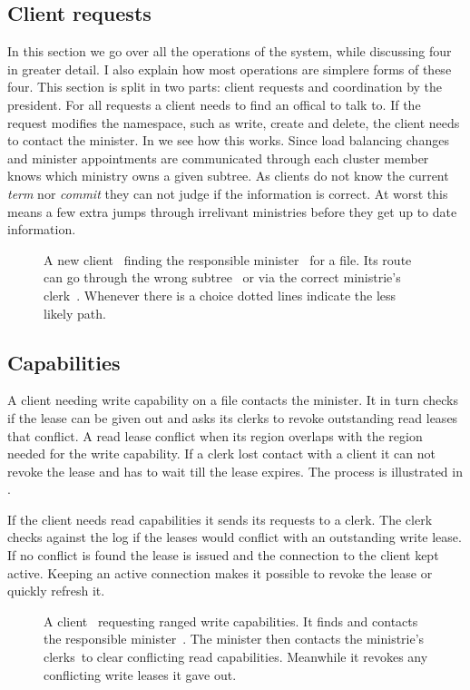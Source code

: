 \subsection{Client requests} %
In this section we go over all the operations of the system, while discussing four in greater detail. I also explain how most operations are simplere forms of these four. This section is split in two parts: client requests and coordination by the president.
%
For all requests a client needs to find an offical to talk to. If the request modifies the namespace, such as write, create and delete, the client needs to contact the minister. In  we see how this works. Since load balancing changes and minister appointments are communicated through \raft{} each cluster member knows which ministry owns a given subtree. As clients do not know the current \raft{} \textit{term} nor \textit{commit} they can not judge if the information is correct. At worst this means a few extra jumps through irrelivant ministries before they get up to date information.
%
\begin{figure}[htbp]
	\centering
	
	\caption{A new client~\clientLeg{} finding the responsible minister~\amdsLeg{} for a file. Its route can go through the wrong subtree~\umdsLeg{} or via the correct ministrie's clerk~\cmdsLeg{}. Whenever there is a choice dotted lines indicate the less likely path.}
	\label{fig:find_aMDS}
\end{figure}
%
\subsection*{Capabilities} 
A client needing write capability on a file contacts the minister. It in turn checks if the lease can be given out and asks its clerks to revoke outstanding read leases that conflict. A read lease conflict when its region overlaps with the region needed for the write capability. If a clerk lost contact with a client it can not revoke the lease and has to wait till the lease expires. The process is illustrated in . 

If the client needs read capabilities it sends its requests to a clerk. The clerk checks against the \raft{} log if the leases would conflict with an outstanding write lease. If no conflict is found the lease is issued and the connection to the client kept active. Keeping an active connection makes it possible to revoke the lease or quickly refresh it.
%
\begin{figure}[htbp]
	\centering
	
	\caption{A client~\clientLeg{} requesting ranged write capabilities. It finds and contacts the responsible minister~\amdsLeg{}. The minister then contacts the ministrie's clerks~\cmdsLeg to clear conflicting read capabilities. Meanwhile it revokes any conflicting write leases it gave out.}
	\label{fig:write}
\end{figure}
%
